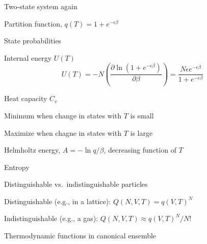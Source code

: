 \message{ !name(Outline.tex)}\documentclass[11pt]{article}
\begin{document}
\begin{outline}
\begin{outline}
    \item Two-state system again
      \begin{outline}
      \item Partition function, $q(T)=1+e^{-\epsilon\beta}$
      \item State probabilities
      \item{Internal energy $U(T)$}
        \begin{equation}
          U(T)=-N \left ( \frac{\partial \ln(1+e^{-\epsilon\beta})}{\partial\beta}
          \right)=\frac{N\epsilon e^{-\epsilon\beta}}{1+e^{-\epsilon\beta}}
        \end{equation}
     \item Heat capacity $C_v$
        \begin{outline}
        \item Minimum when change in states with $T$ is small
        \item Maximize when chagne in states with $T$ is large
        \end{outline}
      \item Helmholtz energy, $A= -\ln q/\beta$, decreasing function of $T$
      \item Entropy
      \end{outline}
    \item Distinguishable vs.\ indistinguishable particles
      \begin{outline}
      \item Distinguishable (e.g., in a lattice): $Q(N,V,T) = q(V,T)^N$
      \item Indistinguishable (e.g., a gas): $Q(N,V,T)\approx q(V,T)^N/N!$
      \end{outline}
      \item Thermodynamic functions in canonical ensemble
    \end{outline}


\end{outline}
\end{document}
